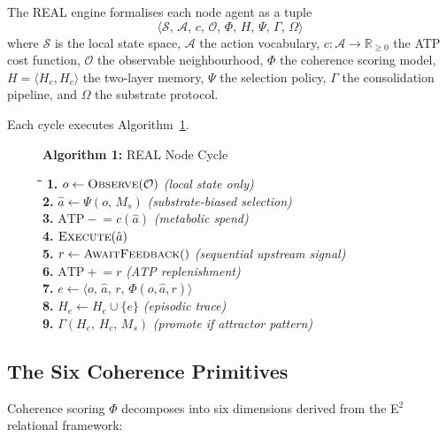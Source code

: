 \documentclass[10pt,twocolumn]{article}
\newcommand{\atp}{\mathrm{ATP}}
\newcommand{\He}{H_e}
\newcommand{\Hc}{H_c}
\newcommand{\Ms}{M_s}
\begin{document}
The REAL engine formalises each node agent as a tuple
\[
  \langle \mathcal{S},\, \mathcal{A},\, c,\, \mathcal{O},\,
          \Phi,\, H,\, \Psi,\, \Gamma,\, \Omega \rangle
\]
where $\mathcal{S}$ is the local state space, $\mathcal{A}$ the action
vocabulary, $c: \mathcal{A} \to \mathbb{R}_{\geq 0}$ the ATP cost function,
$\mathcal{O}$ the observable neighbourhood, $\Phi$ the coherence scoring model,
$H = \langle \He, \Hc \rangle$ the two-layer memory, $\Psi$ the selection
policy, $\Gamma$ the consolidation pipeline, and $\Omega$ the substrate protocol.

Each cycle executes Algorithm~\ref{alg:real_cycle}.

\begin{figure}[t]
\small
\textbf{Algorithm 1:} REAL Node Cycle\\[4pt]
\begin{tabbing}
\quad\=\quad\=\quad\=\kill
\textbf{1.} \> $o \leftarrow \textsc{Observe}(\mathcal{O})$
              \hfill\textit{(local state only)} \\
\textbf{2.} \> $\hat{a} \leftarrow \Psi(o,\,\Ms)$
              \hfill\textit{(substrate-biased selection)} \\
\textbf{3.} \> $\atp \mathrel{-}= c(\hat{a})$
              \hfill\textit{(metabolic spend)} \\
\textbf{4.} \> $\textsc{Execute}(\hat{a})$ \\
\textbf{5.} \> $r \leftarrow \textsc{AwaitFeedback}()$
              \hfill\textit{(sequential upstream signal)} \\
\textbf{6.} \> $\atp \mathrel{+}= r$
              \hfill\textit{(ATP replenishment)} \\
\textbf{7.} \> $e \leftarrow \langle o,\,\hat{a},\,r,\,\Phi(o,\hat{a},r)\rangle$ \\
\textbf{8.} \> $\He \leftarrow \He \cup \{e\}$
              \hfill\textit{(episodic trace)} \\
\textbf{9.} \> $\Gamma(\He,\,\Hc,\,\Ms)$
              \hfill\textit{(promote if attractor pattern)}
\end{tabbing}
\label{alg:real_cycle}
\end{figure}

\subsection{The Six Coherence Primitives}

Coherence scoring $\Phi$ decomposes into six dimensions derived from the
E$^2$ relational framework:
\end{document}
